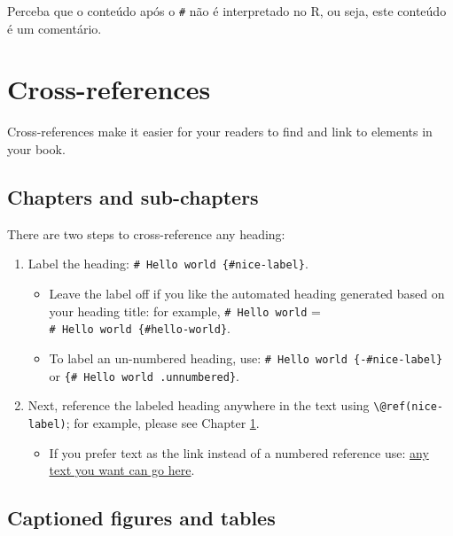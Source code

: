 \documentclass[
]{book}
\providecommand{\tightlist}{%
  \setlength{\itemsep}{0pt}\setlength{\parskip}{0pt}}
\theoremstyle{definition}
\theoremstyle{definition}
\theoremstyle{definition}
\theoremstyle{definition}
\theoremstyle{remark}
\begin{document}
Perceba que o conteúdo após o \texttt{\#} não é interpretado no R, ou seja, este conteúdo é um comentário.

\hypertarget{cross}{%
\chapter{Cross-references}\label{cross}}

Cross-references make it easier for your readers to find and link to elements in your book.

\hypertarget{chapters-and-sub-chapters}{%
\section{Chapters and sub-chapters}\label{chapters-and-sub-chapters}}

There are two steps to cross-reference any heading:

\begin{enumerate}
\def\labelenumi{\arabic{enumi}.}
\tightlist
\item
  Label the heading: \texttt{\#\ Hello\ world\ \{\#nice-label\}}.

  \begin{itemize}
  \tightlist
  \item
    Leave the label off if you like the automated heading generated based on your heading title: for example, \texttt{\#\ Hello\ world} = \texttt{\#\ Hello\ world\ \{\#hello-world\}}.
  \item
    To label an un-numbered heading, use: \texttt{\#\ Hello\ world\ \{-\#nice-label\}} or \texttt{\{\#\ Hello\ world\ .unnumbered\}}.
  \end{itemize}
\item
  Next, reference the labeled heading anywhere in the text using \texttt{\textbackslash{}@ref(nice-label)}; for example, please see Chapter \ref{cross}.

  \begin{itemize}
  \tightlist
  \item
    If you prefer text as the link instead of a numbered reference use: \protect\hyperlink{cross}{any text you want can go here}.
  \end{itemize}
\end{enumerate}

\hypertarget{captioned-figures-and-tables}{%
\section{Captioned figures and tables}\label{captioned-figures-and-tables}}
\end{document}
